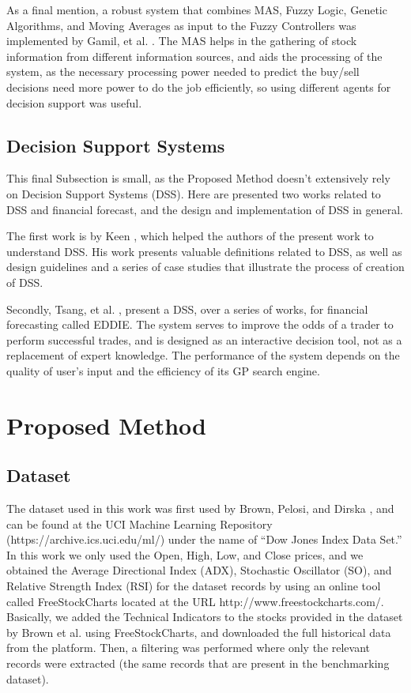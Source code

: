 \documentclass[12pt,journal,draftcls,onecolumn]{IEEEtran}
\begin{document}
As a final mention, a robust system that combines MAS, Fuzzy Logic, Genetic Algorithms, and Moving Averages as input to the Fuzzy Controllers was implemented by Gamil, et al. \cite{Gamil2007}. The MAS helps in the gathering of stock information from different information sources, and aids the processing of the system, as the necessary processing power needed to predict the buy/sell decisions need more power to do the job efficiently, so using different agents for decision support was useful.

\subsection{Decision Support Systems}
\label{decision-support-systems}

This final Subsection is small, as the Proposed Method doesn't extensively rely on Decision Support Systems (DSS). Here are presented two works related to DSS and financial forecast, and the design and implementation of DSS in general.

The first work is by Keen \cite{keen1980decision}, which helped the authors of the present work to understand DSS. His work presents valuable definitions related to DSS, as well as design guidelines and a series of case studies that illustrate the process of creation of DSS.

Secondly, Tsang, et al. \cite{tsang1998eddie} \cite{tsang2000eddie} \cite{Tsang2004}  \cite{Tsang2008}, present a DSS, over a series of works, for financial forecasting called EDDIE. The system serves to improve the odds of a trader to perform successful trades, and is designed as an interactive decision tool, not as a replacement of expert knowledge. The performance of the system depends on the quality of user's input and the efficiency of its GP search engine.

\section{Proposed Method}
\label{proposed-method}

\subsection{Dataset}
\label{dataset}

The dataset used in this work was first used by Brown, Pelosi, and Dirska \cite{brown2013dynamic}, and can be found at the UCI Machine Learning Repository (https://archive.ics.uci.edu/ml/) under the name of ``Dow Jones Index Data Set.'' In this work we only used the Open, High, Low, and Close prices, and we obtained the Average Directional Index (ADX), Stochastic Oscillator (SO), and Relative Strength Index (RSI) for the dataset records by using an online tool called FreeStockCharts located at the URL http://www.freestockcharts.com/. Basically, we added the Technical Indicators to the stocks provided in the dataset by Brown et al. using FreeStockCharts, and downloaded the full historical data from the platform. Then, a filtering was performed where only the relevant records were extracted (the same records that are present in the benchmarking dataset).
\end{document}
